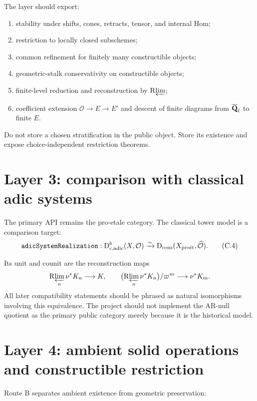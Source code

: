 \begin{formalization}
The layer should export:
\begin{enumerate}
\item stability under shifts, cones, retracts, tensor, and internal Hom;
\item restriction to locally closed subschemes;
\item common refinement for finitely many constructible objects;
\item geometric-stalk conservativity on constructible objects;
\item finite-level reduction and reconstruction by \(\mathrm R\!\varprojlim\);
\item coefficient extension
      \(\mathcal O\to E\to E'\) and descent of finite diagrams from
      \(\overline{\mathbf Q}_\ell\) to finite \(E\).
\end{enumerate}
Do not store a chosen stratification in the public object.  Store its
existence and expose choice-independent restriction theorems.
\end{formalization}

\section{Layer 3: comparison with classical adic systems}

The primary API remains the pro-etale category.  The classical tower model is
a comparison target:
\[
 \texttt{adicSystemRealization}:
 \mathrm D^b_{c,\mathrm{adic}}(X,\mathcal O)
 \xrightarrow{\sim}
 \mathrm D_{\mathrm{cons}}(X_{\mathrm{pro\acute et}},\widehat{\mathcal O}).
\tag{C.4}\label{eq:formalization-adic-comparison}
\]

Its unit and counit are the reconstruction maps
\[
 \mathrm R\!\varprojlim_n\nu^*K_n\longrightarrow K,
\qquad
 \bigl(\mathrm R\!\varprojlim_n\nu^*K_n\bigr)/\varpi^m\longrightarrow\nu^*K_m.
\]
All later compatibility statements should be phrased as natural
isomorphisms involving this equivalence.  The project should not implement
the AR-null quotient as the primary public category merely because it is the
historical model.

\section{Layer 4: ambient solid operations and constructible restriction}

Route B separates ambient existence from geometric preservation:

